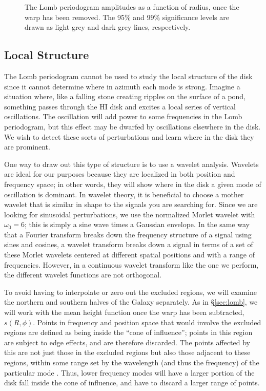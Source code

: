 \documentclass[apj]{emulateapj}
\begin{document}
\begin{figure}
\caption{\label{fig:lombfreqs}The Lomb periodogram amplitudes as a function of radius, once the warp has been removed. The 95\% and 99\% significance levels are drawn as light grey and dark grey lines, respectively.}
\end{figure}




\subsection{Local Structure}\label{sec:wave}

  The Lomb periodogram cannot be used to study the local structure of the disk since it cannot determine where in azimuth each mode is strong. Imagine a situation where, like a falling stone creating ripples on the surface of a pond, something passes through the HI disk and excites a local series of vertical oscillations. The oscillation will add power to some frequencies in the Lomb periodogram, but this effect may be dwarfed by oscillations elsewhere in the disk. We wish to detect these sorts of perturbations and learn where in the disk they are prominent.

One way to draw out this type of structure is to use a wavelet analysis. Wavelets are ideal for our purposes because they are localized in both position and frequency space; in other words, they will show where in the disk a given mode of oscillation is dominant. In wavelet theory, it is beneficial to choose a mother wavelet that is similar in shape to the signals you are searching for. Since we are looking for sinusoidal perturbations, we use the normalized Morlet wavelet with $\omega_0=6$; this is simply a sine wave times a Gaussian envelope. In the same way that a Fourier transform breaks down the frequency structure of a signal using sines and cosines, a wavelet transform breaks down a signal in terms of a set of these Morlet wavelets centered at different spatial positions and with a range of frequencies. However, in a continuous wavelet transform like the one we perform, the different wavelet functions are not orthogonal.

To avoid having to interpolate or zero out the excluded regions, we will examine the northern and southern halves of the Galaxy separately. As in \S \ref{sec:lomb}, we will work with the mean height function once the warp has been subtracted, $s(R,\phi)$.
Points in frequency and position space that would involve the excluded regions are defined as being inside the  ``cone of influence''; points in this region are subject to edge effects, and are therefore discarded. The points affected by this are not just those in the excluded regions but also those adjacent to these regions, within some range set by the wavelength (and thus the frequency) of the particular mode \citep{TC1998}. Thus, lower frequency modes will have a larger portion of the disk fall inside the cone of influence, and have to discard a larger range of points. 
\end{document}
